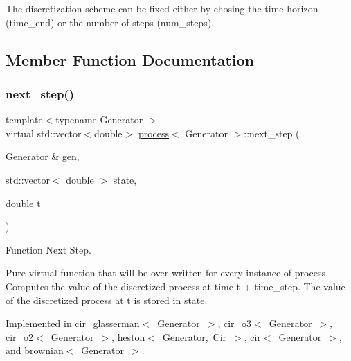 The discretization scheme can be fixed either by chosing the time horizon (time\+\_\+end) or the number of steps (num\+\_\+steps). 

\subsection{Member Function Documentation}
\mbox{\label{classprocess_a55c46e4b4ab1992ce09f4133fb484fd6}} 
\subsubsection{\texorpdfstring{next\+\_\+step()}{next\_step()}}
{\footnotesize\ttfamily template$<$typename Generator $>$ \\
virtual std\+::vector$<$double$>$ \mbox{\hyperlink{classprocess}{process}}$<$ Generator $>$\+::next\+\_\+step (\begin{DoxyParamCaption}\item[{Generator \&}]{gen,  }\item[{std\+::vector$<$ double $>$}]{state,  }\item[{double}]{t }\end{DoxyParamCaption})\hspace{0.3cm}{\ttfamily [pure virtual]}}



Function Next Step. 

Pure virtual function that will be over-\/written for every instance of process. Computes the value of the discretized process at time t + time\+\_\+step. The value of the discretized process at t is stored in state. 

Implemented in \mbox{\hyperlink{classcir__glasserman_aa3a48d9de6edccd4bfb8a52a5e5ad3df}{cir\+\_\+glasserman$<$ Generator $>$}}, \mbox{\hyperlink{classcir__o3_a77d0f79c0634f1d6cd19017e56eab451}{cir\+\_\+o3$<$ Generator $>$}}, \mbox{\hyperlink{classcir__o2_aff77d63ff38cedf7f720f4bf081b3812}{cir\+\_\+o2$<$ Generator $>$}}, \mbox{\hyperlink{classheston_a81ef826578f2a62320698e88cc2b1b3b}{heston$<$ Generator, Cir $>$}}, \mbox{\hyperlink{classcir_ad3d4f7db1a4448632a6fdbada17cc651}{cir$<$ Generator $>$}}, and \mbox{\hyperlink{classbrownian_afb58e5d64bc76193fcce54cf611f3671}{brownian$<$ Generator $>$}}.

\mbox{\label{classprocess_ac728fbbd27c9e9d0b590e18e132480af}} 
